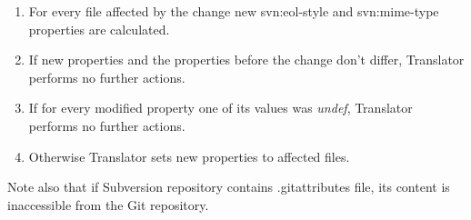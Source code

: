 \begin{enumerate}
\compactlist
\item For every file affected by the change new svn:eol-style and svn:mime-type properties are calculated.\\
\item If new properties and the properties before the change don't differ, Translator performs no further actions.\\
\item If for every modified property one of its values was \emph{undef}, Translator performs no further actions.\\
\item Otherwise Translator sets new properties to affected files.\\
\end{enumerate}

Note also that if Subversion repository contains .gitattributes file, its content is inaccessible from the Git repository.

